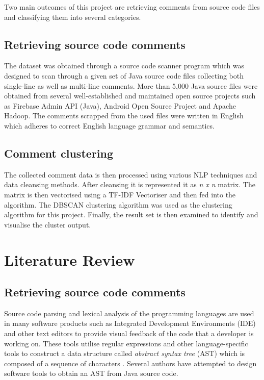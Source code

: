 \documentclass[conference]{IEEEtran}
\begin{document}
Two main outcomes of this project are retrieving comments from source code files and classifying them into several categories. 

\subsection{Retrieving source code comments}

The dataset was obtained through a source code scanner program which was designed to scan through a given set of Java source code files collecting both single-line as well as multi-line comments. More than 5,000 Java source files were obtained from several well-established and maintained open source projects such as Firebase Admin API (Java), Android Open Source Project and Apache Hadoop. The comments scrapped from the used files were written in English which adheres to correct English language grammar and semantics.  

\subsection{Comment clustering}

The collected comment data is then processed using various NLP techniques and data cleansing methods. After cleansing it is represented it as \textit{n x n} matrix. The matrix is then vectorised using a TF-IDF Vectoriser and then fed into the algorithm. The DBSCAN clustering algorithm was used as the clustering algorithm for this project. Finally, the result set is then examined to identify and visualise the cluster output. 

\section{Literature Review}

\subsection{Retrieving source code comments}

Source code parsing and lexical analysis of the programming languages are used in many software products such as Integrated Development Environments (IDE) and other text editors to provide visual feedback of the code that a developer is working on. These tools utilise regular expressions and other language-specific tools to construct a data structure called \textit{abstract syntax tree} (AST) which is composed of a sequence of characters \cite{BADROS2000159}. Several authors have attempted to design software tools to obtain an AST from Java source code.
\end{document}
